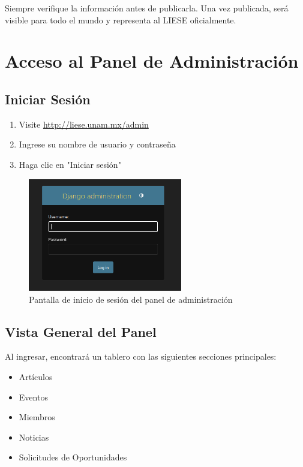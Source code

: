 \documentclass[12pt,letterpaper]{report}
\newenvironment{warning-box}
    {\begin{mdframed}[linecolor=warning,linewidth=2pt,backgroundcolor=warning!10]
    \textbf{Advertencia:}\par}
    {\end{mdframed}}
\begin{document}
\begin{warning-box}
Siempre verifique la información antes de publicarla. Una vez publicada, será visible para todo el mundo y representa al LIESE oficialmente.
\end{warning-box}

\chapter{Acceso al Panel de Administración}

\section{Iniciar Sesión}
\begin{enumerate}
    \item Visite \url{http://liese.unam.mx/admin}
    \item Ingrese su nombre de usuario y contraseña
    \item Haga clic en "Iniciar sesión"
\end{enumerate}

\begin{figure}[H]
    \centering
    \includegraphics[width=0.6\textwidth]{images/login.png}
    \caption{Pantalla de inicio de sesión del panel de administración}
\end{figure}

\section{Vista General del Panel}
Al ingresar, encontrará un tablero con las siguientes secciones principales:
\begin{itemize}
    \item Artículos
    \item Eventos
    \item Miembros
    \item Noticias
    \item Solicitudes de Oportunidades
\end{itemize}
\end{document}
